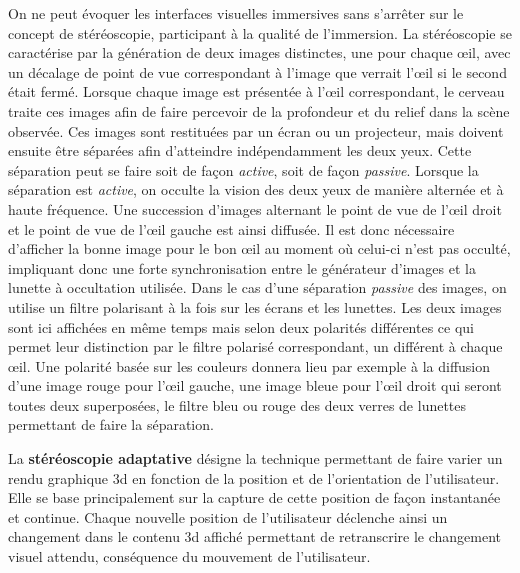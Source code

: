 On ne peut évoquer les interfaces visuelles immersives sans s'arrêter sur le concept de stéréoscopie, participant à la qualité de l'immersion. La stéréoscopie se caractérise par la génération de deux images distinctes, une pour chaque œil, avec un décalage de point de vue correspondant à l'image que verrait l'œil si le second était fermé. Lorsque chaque image est présentée à l'œil correspondant, le cerveau traite ces images afin de faire percevoir de la profondeur et du relief dans la scène observée. Ces images sont restituées par un écran ou un projecteur, mais doivent ensuite être séparées afin d'atteindre indépendamment les deux yeux. Cette séparation peut se faire soit de façon \textit{active}, soit de façon \textit{passive}. Lorsque la séparation est \textit{active}, on occulte la vision des deux yeux de manière alternée et à haute fréquence. Une succession d'images alternant le point de vue de l'œil droit et le point de vue de l'œil gauche est ainsi diffusée. Il est donc nécessaire d'afficher la bonne image pour le bon œil au moment où celui-ci n'est pas occulté, impliquant donc une forte synchronisation entre le générateur d'images et la lunette à occultation utilisée.
Dans le cas d'une séparation \textit{passive} des images, on utilise un filtre polarisant à la fois sur les écrans et les lunettes. Les deux images sont ici affichées en même temps mais selon deux polarités différentes ce qui permet leur distinction par le filtre polarisé correspondant, un différent à chaque œil. Une polarité basée sur les couleurs donnera lieu par exemple à la diffusion d'une image rouge pour l'œil gauche, une image bleue pour l'œil droit qui seront toutes deux superposées, le filtre bleu ou rouge des deux verres de lunettes permettant de faire la séparation.

 \label{visu_adaptative}

La \textbf{stéréoscopie adaptative} désigne la technique permettant de faire varier un rendu graphique 3d en fonction de la position et de l'orientation de l'utilisateur. Elle se base principalement sur la capture de cette position de façon instantanée et continue. Chaque nouvelle position de l'utilisateur déclenche ainsi un changement dans le contenu 3d affiché permettant de retranscrire le changement visuel attendu, conséquence du mouvement de l'utilisateur.

